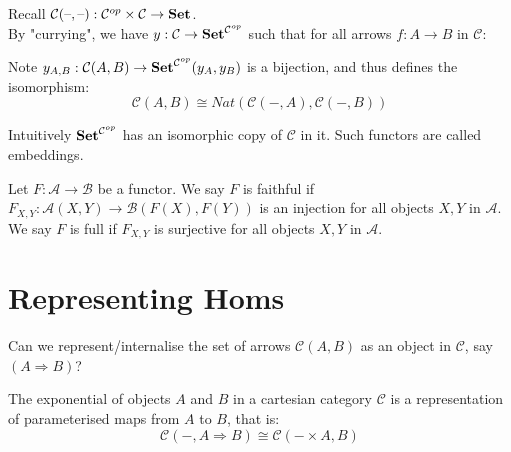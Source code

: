 \begin{definition}
Recall $\mathcal{C}(\text{--}, \text{--}): \mathcal{C}^{op} \times \mathcal{C} \rightarrow \mathbf {Set}$.\\
By "currying", we have $y: \mathcal{C} \rightarrow \mathbf {Set}^{\mathcal{C}^{op}}$ such that for all arrows $f: A \rightarrow B$ in $\mathcal{C}$:
\begin{center}
\end{center}

Note $y_{A,B} : \mathcal{C}(A,B) \rightarrow \mathbf {Set}^{\mathcal{C}^{op}}(y_A, y_B)$ is a bijection, and thus defines the isomorphism:
\[ \mathcal{C}(A,B)  \cong  Nat( \mathcal{C}(-,A), \mathcal{C}(-,B)) \]

Intuitively $\mathbf {Set}^{\mathcal{C}^{op}}$ has an isomorphic copy of $\mathcal{C}$ in it. Such functors are called embeddings.
\end{definition}


\begin{definition}
Let $F : \mathcal{A} \rightarrow \mathcal{B}$ be a functor. We say $F$ is faithful if $F_{X,Y} : \mathcal{A}(X,Y) \rightarrow \mathcal{B}(F(X),F(Y))$ is an injection for all objects $X,Y$ in $\mathcal{A}$. We say $F$ is full if $F_{X,Y}$ is surjective for all objects $X,Y$ in $\mathcal{A}$.
\end{definition}


\section{Representing Homs}

Can we represent/internalise the set of arrows $\mathcal{C}(A,B)$ as an object in $\mathcal{C}$, say $(A \Rightarrow B)$?

\begin{definition}[Exponentials]
The exponential of objects $A$ and $B$ in a cartesian category $\mathcal{C}$ is a representation of parameterised maps from $A$ to $B$, that is:
\[  \mathcal{C}(-, A \Rightarrow B) \cong \mathcal{C}(-\times A, B)  \]

\end{definition}

